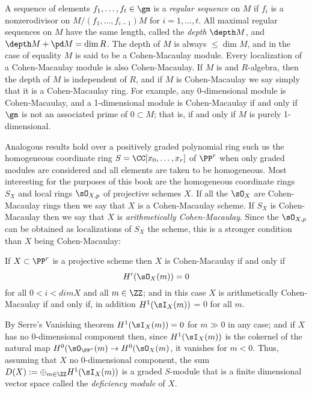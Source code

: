 A sequence of elements $f_1,\dots, f_t\in \gm$ is a \emph{regular sequence} on $M$ if $f_i$ is a nonzerodivisor on $M/(f_1, \dots, f_{i-1})M$
for $i = 1,\dots,t$. 
All maximal regular sequences on $M$ have the same length, called the \emph{depth}  $\depth M$, and 
$\depth M + \pd M = \dim R$. The depth of $M$ is always $\leq \dim M$, and in the case of equality $M$ is said to be a Cohen-Macaulay module. Every
localization of a Cohen-Macaulay module is also Cohen-Macaulay. If $M$ is and $R$-algebra, then the depth of $M$ is independent
of $R$, and if $M$ is Cohen-Macaulay we say simply that it is a Cohen-Macaulay ring. For example, any 0-dimensional module is Cohen-Macaulay,
and a 1-dimensional module is Cohen-Macaulay if and only if $\gm$ is not an associated prime of $0\subset M$; that is, if and only if $M$ is purely 1-dimensional.

Analogous results hold over a positively graded polynomial ring such us the homogeneous coordinate ring $S = \CC[x_0,\dots,x_r]$ of $\PP^r$ when
only graded modules are considered and all elements are taken to be homogeneous. Most interesting for the purposes of this book are the
homogeneous coordinate rings $S_X$ and local rings $\sO_{X,p}$ of projective schemes $X$. If all the $\sO_X$ are Cohen-Macaulay rings then we say that
$X$ is a Cohen-Macaulay scheme. If $S_X$ is Cohen-Macaulay then we say that $X$ is \emph{arithmetically Cohen-Macaulay}. Since the $\sO_{X,p}$ can be obtained as localizations of $S_X$ the scheme, this is a stronger condition than $X$ being Cohen-Macaulay:
\begin{proposition}
If $X\subset \PP^r$ is a projective scheme then $X$ is Cohen-Macaulay if and only if 
$$
H^i(\sO_X(m))= 0
$$
for all $0<i<dim X$ and all $m\in \ZZ$; and in this case
 $X$ is arithmetically Cohen-Macaulay if and only if, in addition
$H^1(\sI_X(m))$ = 0 for all $m$.
\end{proposition}

By Serre's Vanishing theorem $H^1(\sI_X(m)) = 0$ for $m\gg 0$ in any case; and if $X$ has
no 0-dimensional component then, since $H^1(\sI_X(m))$ is the cokernel of the natural map $H^0(\sO_{\PP^r}(m) \to H^0(\sO_{X}(m)$,
it vanishes for $m<0$. Thus, assuming that  $X$
no 0-dimensional component, the sum $D(X) := \oplus_{m\in \ZZ} H^1(\sI_X(m))$ is a graded $S$-module that
is a finite dimensional vector space called the \emph{deficiency module} of $X$.

